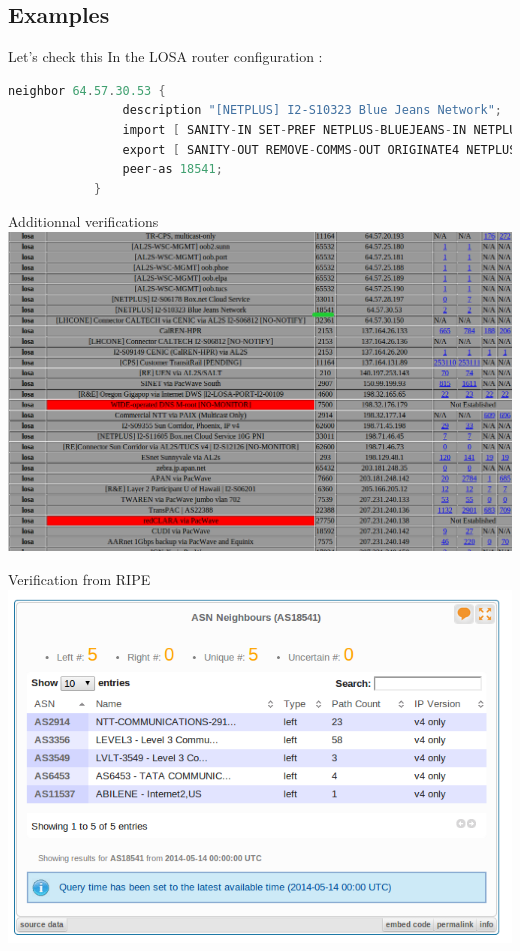 \documentclass[usenames,dvipsnames]{beamer}
\begin{document}
\subsection{Examples}

\begin{frame}[fragile]{Let's check this}
In the LOSA router configuration : 
\begin{lstlisting}[language=C]
neighbor 64.57.30.53 {
                description "[NETPLUS] I2-S10323 Blue Jeans Network";
                import [ SANITY-IN SET-PREF NETPLUS-BLUEJEANS-IN NETPLUS-CLOUD-IN ];
                export [ SANITY-OUT REMOVE-COMMS-OUT ORIGINATE4 NETPLUS-BLUEJEANS-OUT NETPLUS-CLOUD-OUT ];
                peer-as 18541;
            }
\end{lstlisting}

\end{frame}


\begin{frame}{Additionnal verifications}
\includegraphics[width=\textwidth]{losa_18541.png}
\end{frame}

\begin{frame}{Verification from RIPE}
\includegraphics[width=\textwidth]{AS18541_neighbors.png}
\end{frame}
\end{document}

